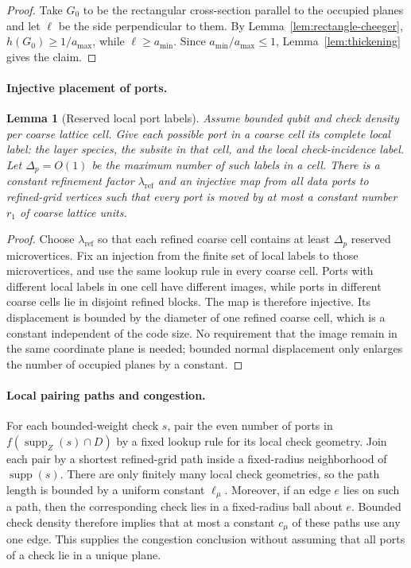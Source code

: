 \documentclass[aps,prx,reprint,superscriptaddress,nofootinbib,floatfix,longbibliography]{revtex4-2}
\newtheorem{lemma}[theorem]{Lemma}
\theoremstyle{definition}
\begin{document}
\begin{proof}
Take $G_0$ to be the rectangular cross-section parallel to the occupied
planes and let $\ell$ be the side perpendicular to them.  By
Lemma~\ref{lem:rectangle-cheeger},
$h(G_0)\geq 1/a_{\max}$, while $\ell\geq a_{\min}$.  Since
$a_{\min}/a_{\max}\leq1$, Lemma~\ref{lem:thickening} gives the
claim.
\end{proof}

\paragraph{Injective placement of ports.}
\begin{lemma}[Reserved local port labels]
\label{lem:reserved-ports}
Assume bounded qubit and check density per coarse lattice cell.  Give each
possible port in a coarse cell its complete local label: the layer species,
the subsite in that cell, and the local check-incidence label.  Let
$\Delta_p=O(1)$ be the maximum number of such labels in a cell.  There is a
constant refinement factor $\lambda_{\mathrm{ref}}$ and an injective map
from all data ports to refined-grid vertices such that every port is moved
by at most a constant number $r_1$ of coarse lattice units.
\end{lemma}

\begin{proof}
Choose $\lambda_{\mathrm{ref}}$ so that each refined coarse cell contains
at least $\Delta_p$ reserved microvertices.  Fix an injection from the
finite set of local labels to those microvertices, and use the same lookup
rule in every coarse cell.  Ports with different local labels in one cell
have different images, while ports in different coarse cells lie in
disjoint refined blocks.  The map is therefore injective.  Its displacement
is bounded by the diameter of one refined coarse cell, which is a constant
independent of the code size.  No requirement that the image remain in the
same coordinate plane is needed; bounded normal displacement only enlarges
the number of occupied planes by a constant.
\end{proof}

\paragraph{Local pairing paths and congestion.}
For each bounded-weight check $s$, pair the even number of ports in
$f(\operatorname{supp}_Z(s)\cap D)$ by a fixed lookup rule for its local
check geometry.  Join each pair by a shortest refined-grid path inside a
fixed-radius neighborhood of $\operatorname{supp}(s)$.  There are only
finitely many local check geometries, so the path length is bounded by a
uniform constant $\ell_\mu$.  Moreover, if an edge $e$ lies on such a path,
then the corresponding check lies in a fixed-radius ball about $e$.
Bounded check density therefore implies that at most a constant $c_\mu$
of these paths use any one edge.  This supplies the congestion conclusion
without assuming that all ports of a check lie in a unique plane.
\end{document}
